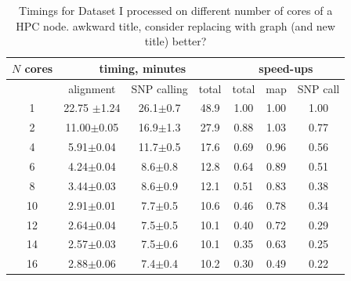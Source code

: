 \documentclass[10pt]{article}
\newcommand{\COMMENT}[1]{{\color{red} #1 }}
\newcommand{\COM}[1]{{\color{blue} #1 }}
\begin{document}
\begin{table}[!ht]
\small
\caption{Timings for Dataset I processed on different number of cores of a HPC node. \COMMENT{awkward title, consider replacing with graph (and new title)} \COM{better?}}
\begin{center}
\begin{tabular}{c|c|c|c|ccc}
$N$ cores	&\multicolumn{3}{c|}{timing, minutes}&\multicolumn{3}{c}{speed-ups} \\
\hline
	& alignment 	&	SNP calling	&	total  &total & map& SNP call\\
\hline
1	&	22.75	$\pm$1.24&	26.1$\pm$0.7	&	48.9	&	 1.00	&	1.00	&	1.00\\
2	&	11.00$\pm$0.05	&	16.9$\pm$1.3	&	27.9	&	 0.88	&	1.03	&	0.77\\
4	&	5.91$\pm$0.04	&	11.7$\pm$0.5	&	17.6	&	 0.69	&	0.96	&	0.56\\
6	&	4.24$\pm$0.04	&	8.6$\pm$0.8	&	12.8	&	 0.64	&	0.89	&	0.51\\
8	&	3.44$\pm$0.03	&	8.6$\pm$0.9	&	12.1	&	 0.51	&	0.83	&	0.38\\
10	&	2.91$\pm$0.01	&	7.7$\pm$0.5	&	10.6	&	 0.46	&	0.78	&	0.34\\
12	&	2.64$\pm$0.04	&	7.5$\pm$0.5	&	10.1	&	 0.40	&	0.72	&	0.29\\
14	&	2.57$\pm$0.03	&	7.5$\pm$0.6	&	10.1	&	 0.35	&	0.63	&	0.25\\
16	&	2.88$\pm$0.06	&	7.4$\pm$0.4	&	10.2	&	 0.30	&	0.49	&	0.22\\
\end{tabular}
\end{center}
\label{table:3}
\normalsize
\end{table}
\end{document}

